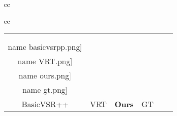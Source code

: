 \documentclass[10pt,twocolumn,letterpaper]{article}
\newcommand{\name}{0}
\newcommand{\h}{0}
\newcommand{\w}{0.15}
\newlength \g
\begin{document}
\begin{figure*}[t!]
{\begin{tabular}{cc}
\begin{tabular}{cc}
\begin{adjustbox}{valign=t}
\begin{tabular}{cccccc}
						\\
						\vspace{-2mm}
						\\
						\texttt{[image: \\name basicvsrpp.png]} \hspace{\g} &
						\texttt{[image: \\name VRT.png]} \hspace{\g} &
						\texttt{[image: \\name ours.png]}
						\hspace{\g} &		
						\texttt{[image: \\name gt.png]}   \\ 
						BasicVSR++ \cite{chan2021basicvsrpp} \hspace{\g} &	VRT \cite{liang2022vrt} \hspace{\g} &
						\textbf{Ours} &
						GT
						\\
					\end{tabular}
				\end{adjustbox}
			\end{tabular}
			

\end{tabular}}
\end{figure*}
\end{document}
